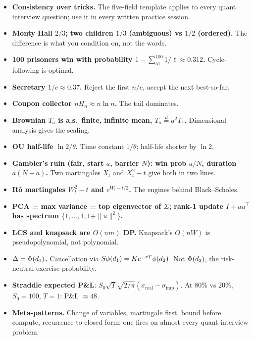 \begin{itemize}
  \item \textbf{Consistency over tricks.}  The five-field template
    applies to every quant interview question; use it in every
    written practice session.
  \item \textbf{Monty Hall $2/3$; two children $1/3$ (ambiguous)
    vs $1/2$ (ordered).}  The difference is what you condition on,
    not the words.
  \item \textbf{100 prisoners win with probability $1 -
    \sum_{51}^{100} 1/\ell \approx 0.312$.}  Cycle-following is
    optimal.
  \item \textbf{Secretary $1/e \approx 0.37$.}  Reject the first
    $n/e$, accept the next best-so-far.
  \item \textbf{Coupon collector $n H_n \approx n \ln n$.}  The
    tail dominates.
  \item \textbf{Brownian $T_a$ is a.s.\ finite, infinite mean,
    $T_a \stackrel{d}{=} a^2 T_1$.}  Dimensional analysis gives the
    scaling.
  \item \textbf{OU half-life $\ln 2 / \theta$.}  Time constant
    $1/\theta$; half-life shorter by $\ln 2$.
  \item \textbf{Gambler's ruin (fair, start $a$, barrier $N$): win
    prob $a/N$, duration $a(N-a)$.}  Two martingales $X_t$ and
    $X_t^2 - t$ give both in two lines.
  \item \textbf{It\^o martingales $W_t^2 - t$ and $e^{W_t - t/2}$.}
    The engines behind Black--Scholes.
  \item \textbf{PCA = max variance = top eigenvector of $\Sigma$;
    rank-1 update $I + uu^\top$ has spectrum $\{1,\dots,1,
    1 + \|u\|^2\}$.}
  \item \textbf{LCS and knapsack are $O(nm)$ DP.}  Knapsack's
    $O(nW)$ is pseudopolynomial, not polynomial.
  \item \textbf{$\Delta = \Phi(d_1)$.}  Cancellation via
    $S \phi(d_1) = Ke^{-rT}\phi(d_2)$.  Not $\Phi(d_2)$, the
    risk-neutral exercise probability.
  \item \textbf{Straddle expected P\&L}: $S_0 \sqrt T \sqrt{2/\pi}
    (\sigma_{\mathrm{real}} - \sigma_{\mathrm{imp}})$.  At 80\% vs
    20\%, $S_0 = 100$, $T = 1$: P\&L $\approx 48$.
  \item \textbf{Meta-patterns.}  Change of variables, martingale
    first, bound before compute, recurrence to closed form: one
    fires on almost every quant interview problem.
\end{itemize}
